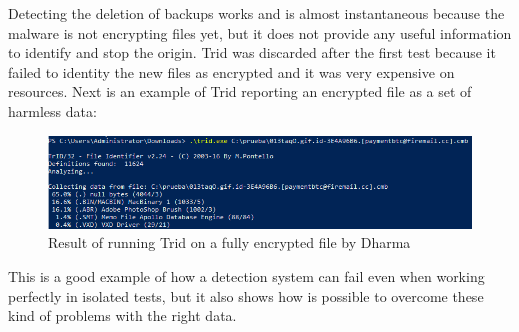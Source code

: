\linej
\linej
Detecting the deletion of backups works and is almost instantaneous because the malware is not encrypting files yet, but it does not provide any useful information to identify and stop the origin.
\linej
\linej
Trid was discarded after the first test because it failed to identity the new files as encrypted and it was very expensive on resources.
Next is an example of Trid reporting an encrypted file as a set of harmless data:
\begin{figure}[H]
	\centering
	\includegraphics[width=\textwidth]{figuras/Trid_Dharma.png}
	\caption{Result of running Trid on a fully encrypted file by Dharma}
\end{figure}
\linej
This is a good example of how a detection system can fail even when working perfectly in isolated tests, but it also shows how is possible to overcome these kind of problems with the right data.

